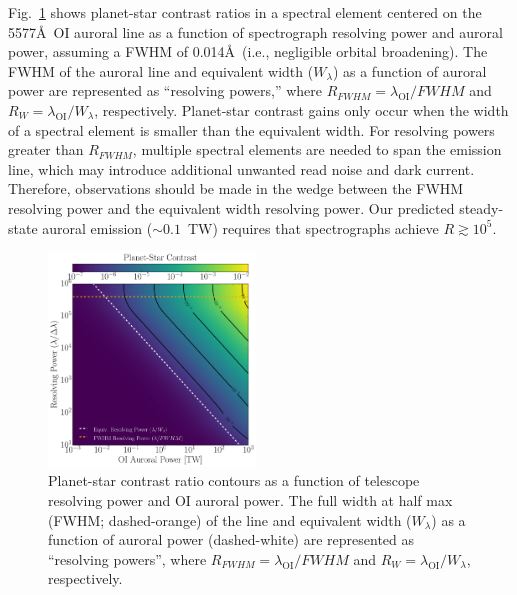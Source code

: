 \documentclass{emulateapj}
\begin{document}
Fig.~\ref{fig:contrast} shows planet-star contrast ratios in a spectral element centered on the 5577\AA\ OI auroral line as a function of spectrograph resolving power and auroral power, assuming a FWHM of 0.014\AA\ (i.e., negligible orbital broadening). The FWHM of the auroral line and equivalent width ($W_{\lambda}$) as a function of auroral power are represented as ``resolving powers,'' where $R_{FWHM} = \lambda_{\text{OI}} / FWHM$ and $R_{W} = \lambda_{\text{OI}} / W_{\lambda}$, respectively. Planet-star contrast gains only occur when the width of a spectral element is smaller than the equivalent width. For resolving powers greater than $R_{FWHM}$, multiple spectral elements are needed to span the emission line, which may introduce additional unwanted read noise and dark current. Therefore, observations should be made in the wedge between the FWHM resolving power and the equivalent width resolving power.  Our predicted steady-state auroral emission (${\sim}0.1$~TW) requires that spectrographs achieve $R \gtrsim 10^5$.

\begin{figure}[bt]
\includegraphics[width=0.49\textwidth]{contrast_vs_R_vs_watts.pdf}
\caption{Planet-star contrast ratio contours as a function of telescope resolving power and OI auroral power. The full width at half max (FWHM; dashed-orange) of the line and equivalent width ($W_{\lambda}$) as a function of auroral power (dashed-white) are represented as ``resolving powers'', where $R_{FWHM} = \lambda_{\text{OI}} / FWHM$ and $R_{W} = \lambda_{\text{OI}} / W_{\lambda}$, respectively.}
\label{fig:contrast}
\end{figure}
\end{document}
